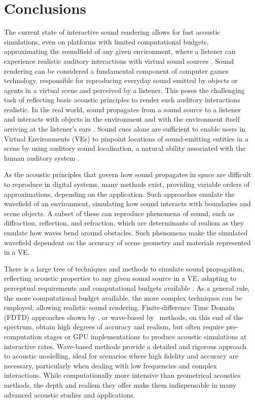 \section{Conclusions}
The current state of interactive sound rendering allows for fast acoustic simulations, even on platforms with limited computational budgets, approximating the soundfield of any given environment, where a listener can experience realistic auditory interactions with virtual sound sources \citep{lakka2018spatial, hulusic2012acoustic}. Sound rendering can be considered a fundamental component of computer games technology, responsible for reproducing everyday sound emitted by objects or agents in a virtual scene and perceived by a listener. This poses the challenging task of reflecting basic acoustic principles to render such auditory interactions realistic. In the real world, sound propagates from a sound source to a listener and interacts with objects in the environment and with the environment itself arriving at the listener's ears \citep{kuttruff2016room}. Sound cues alone are sufficient to enable users in Virtual Environments (VEs) to pinpoint locations of sound-emitting entities in a scene by using auditory sound localisation, a natural ability associated with the human auditory system \citep{lokki2005navigation, rubio2017immersive}.\par
As the acoustic principles that govern how sound propagates in space are difficult to reproduce in digital systems, many methods exist, providing variable orders of approximations, depending on the application. Such approaches emulate the wavefield of an environment, simulating how sound interacts with boundaries and scene objects. A subset of these can reproduce phenomena of sound, such as diffraction, reflection, and refraction, which are determinants of realism as they emulate how waves bend around obstacles. Such phenomena make the simulated wavefield dependent on the accuracy of scene geometry and materials represented in a VE. \par
There is a large tree of techniques and methods to simulate sound propagation, reflecting acoustic properties to any given sound source in a VE, adapting to perceptual requirements and computational budgets available \cite{doukakis2019audio}. As a general rule, the more computational budget available, the more complex techniques can be employed, allowing realistic sound rendering. Finite-difference Time Domain (FDTD) approaches shown by \cite{hamilton2017fdtd}, or wave-based by~\cite{raghuvanshi2014parametric} methods, on this end of the spectrum, obtain high degrees of accuracy and realism, but often require pre-computation stages or GPU implementations to produce acoustic simulations at interactive rates. Wave-based methods provide a detailed and rigorous approach to acoustic modelling, ideal for scenarios where high fidelity and accuracy are necessary, particularly when dealing with low frequencies and complex interactions. While computationally more intensive than geometrical acoustics methods, the depth and realism they offer make them indispensable in many advanced acoustic studies and applications.\par
